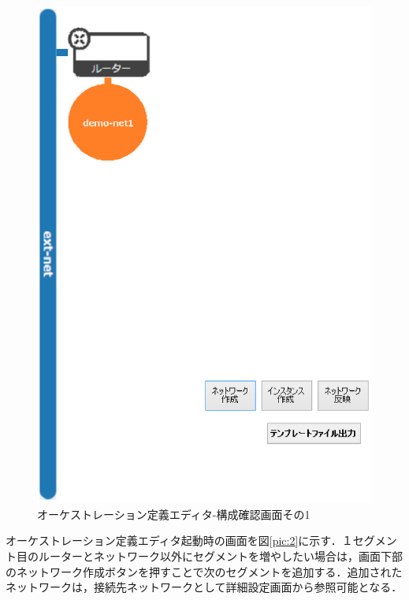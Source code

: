 \documentclass[mingoth]{kut-paper}		%
\begin{document}
		\begin{figure}[h]
			\begin{center}
				\includegraphics[scale=0.55]{Document/構成確認画面１.eps}
				\caption{オーケストレーション定義エディタ-構成確認画面その1}
				\label{pic:1}
			\end{center}
		\end{figure}
		オーケストレーション定義エディタ起動時の画面を図\ref{pic:2}に示す．１セグメント目のルーターとネットワーク以外にセグメントを増やしたい場合は，画面下部のネットワーク作成ボタンを押すことで次のセグメントを追加する．追加されたネットワークは，接続先ネットワークとして詳細設定画面から参照可能となる．
\end{document}
